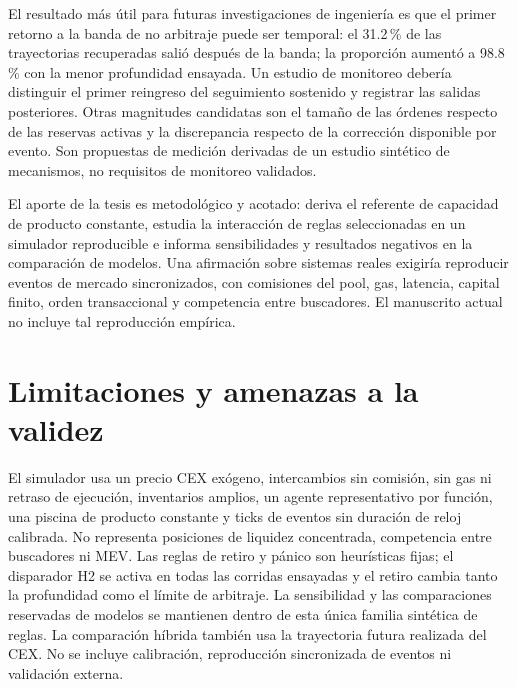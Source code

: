 El resultado más útil para futuras investigaciones de ingeniería es que el primer retorno a la banda de no arbitraje puede ser temporal: el 31.2\,\% de las trayectorias recuperadas salió después de la banda; la proporción aumentó a 98.8\,\% con la menor profundidad ensayada. Un estudio de monitoreo debería distinguir el primer reingreso del seguimiento sostenido y registrar las salidas posteriores. Otras magnitudes candidatas son el tamaño de las órdenes respecto de las reservas activas y la discrepancia respecto de la corrección disponible por evento. Son propuestas de medición derivadas de un estudio sintético de mecanismos, no requisitos de monitoreo validados.

El aporte de la tesis es metodológico y acotado: deriva el referente de capacidad de producto constante, estudia la interacción de reglas seleccionadas en un simulador reproducible e informa sensibilidades y resultados negativos en la comparación de modelos. Una afirmación sobre sistemas reales exigiría reproducir eventos de mercado sincronizados, con comisiones del pool, gas, latencia, capital finito, orden transaccional y competencia entre buscadores. El manuscrito actual no incluye tal reproducción empírica.

\section{Limitaciones y amenazas a la validez}

El simulador usa un precio CEX exógeno, intercambios sin comisión, sin gas ni retraso de ejecución, inventarios amplios, un agente representativo por función, una piscina de producto constante y ticks de eventos sin duración de reloj calibrada. No representa posiciones de liquidez concentrada, competencia entre buscadores ni MEV. Las reglas de retiro y pánico son heurísticas fijas; el disparador H2 se activa en todas las corridas ensayadas y el retiro cambia tanto la profundidad como el límite de arbitraje. La sensibilidad y las comparaciones reservadas de modelos se mantienen dentro de esta única familia sintética de reglas. La comparación híbrida también usa la trayectoria futura realizada del CEX. No se incluye calibración, reproducción sincronizada de eventos ni validación externa.
